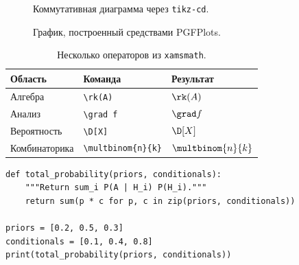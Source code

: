 \documentclass{lecturenotes}
\begin{document}
\begin{figure}[htbp]
  \centering
  \caption{Коммутативная диаграмма через \texttt{tikz-cd}.}
  \label{fig:diagram}
\end{figure}

\begin{figure}[htbp]
  \centering
  \caption{График, построенный средствами PGFPlots.}
  \label{fig:plot}
\end{figure}

\begin{table}[htbp]
  \centering
  \caption{Несколько операторов из \texttt{xamsmath}.}
  \label{tab:operators}
  \begin{tabular}{lll}
    \toprule
    Область & Команда & Результат \\
    \midrule
    Алгебра & \verb|\rk(A)| & $\rk(A)$ \\
    Анализ & \verb|\grad f| & $\grad f$ \\
    Вероятность & \verb|\D[X]| & $\D[X]$ \\
    Комбинаторика & \verb|\multbinom{n}{k}| & $\multbinom{n}{k}$ \\
    \bottomrule
  \end{tabular}
\end{table}

\begin{listing}[htbp]
\begin{verbatim}
def total_probability(priors, conditionals):
    """Return sum_i P(A | H_i) P(H_i)."""
    return sum(p * c for p, c in zip(priors, conditionals))

priors = [0.2, 0.5, 0.3]
conditionals = [0.1, 0.4, 0.8]
print(total_probability(priors, conditionals))
\end{verbatim}
\caption{Минимальный расчет формулы полной вероятности.}
\label{lst:recursion}
\end{listing}
\end{document}
